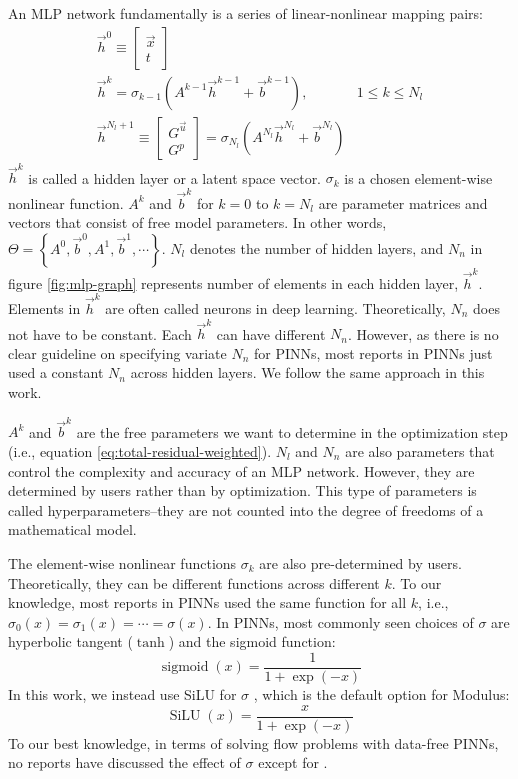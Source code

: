 An MLP network fundamentally is a series of linear-nonlinear mapping pairs:
\begin{equation}\label{eq:mlp-formula}
    \begin{array}{ll}
        \vec{h}^0 \equiv \begin{bmatrix} \vec{x} \\ t \end{bmatrix} & \\
        \vec{h}^k = \sigma_{k-1}\left(A^{k-1}\vec{h}^{k-1}+\vec{b}^{k-1}\right)\text{,} & 1 \le k \le N_l \\
        \vec{h}^{N_l+1}\equiv \begin{bmatrix} G^{\vec{u}} \\ G^p \end{bmatrix} = \sigma_{N_l}\left(A^{N_l}\vec{h}^{N_l}+\vec{b}^{N_l}\right) &
    \end{array}
\end{equation}
$\vec{h}^k$ is called a hidden layer or a latent space vector.
$\sigma_{k}$ is a chosen element-wise nonlinear function.
$A^{k}$ and $\vec{b}^k$ for $k=0$ to $k=N_l$ are parameter matrices and vectors that consist of free model parameters.
In other words, $\Theta=\left\{A^0, \vec{b}^0, A^1, \vec{b}^1, \cdots \right\}$.
$N_l$ denotes the number of hidden layers, and $N_n$ in figure \ref{fig:mlp-graph} represents number of elements in each hidden layer, $\vec{h}^k$.
Elements in $\vec{h}^k$ are often called neurons in deep learning.
Theoretically, $N_n$ does not have to be constant.
Each $\vec{h}^k$ can have different $N_n$.
However, as there is no clear guideline on specifying variate $N_n$ for PINNs, most reports in PINNs just used a constant $N_n$ across hidden layers.
We follow the same approach in this work.

$A^k$ and $\vec{b}^k$ are the free parameters we want to determine in the optimization step (i.e., equation \eqref{eq:total-residual-weighted}).
$N_l$ and $N_n$ are also parameters that control the complexity and accuracy of an MLP network.
However, they are determined by users rather than by optimization.
This type of parameters is called hyperparameters--they are not counted into the degree of freedoms of a mathematical model.

The element-wise nonlinear functions $\sigma_{k}$ are also pre-determined by users.
Theoretically, they can be different functions across different $k$.
To our knowledge, most reports in PINNs used the same function for all $k$, i.e., $\sigma_0(x)=\sigma_1(x)=\cdots=\sigma(x)$.
In PINNs, most commonly seen choices of $\sigma$ are hyperbolic tangent ($\tanh$) and the sigmoid function:
\begin{equation}
    \operatorname{sigmoid}(x) = \frac{1}{1+\exp(-x)}
\end{equation}
In this work, we instead use SiLU for $\sigma$ \cite{hendrycks_gaussian_2020}, which is the default option for Modulus:
\begin{equation}\label{eq:silu}
    \operatorname{SiLU}(x) = \frac{x}{1+\exp(-x)}
\end{equation}
To our best knowledge, in terms of solving flow problems with data-free PINNs, no reports have discussed the effect of $\sigma$ except for \cite{li_integration_2010}.

